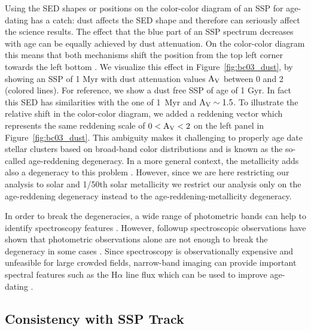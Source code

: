 Using the SED shapes or positions on the color-color diagram of an SSP for age-dating has a catch: dust affects the SED shape and therefore can seriously affect the science results. The effect that the blue part of an SSP spectrum decreases with age can be equally achieved by dust attenuation. On the color-color diagram this means that both mechanisms shift the position from the top left corner towards the left bottom \citep[e.g.][]{whitmore_what_2002,whitmore_what_2002}. 
We visualize this effect in Figure~\ref{fig:bc03_dust}, by showing an SSP of 1 Myr with dust attenuation values ${\rm A_{V}}$ between 0 and 2 (colored lines). For reference, we show a dust free SSP of age of 1 Gyr. In fact this SED has similarities with the one of 1~Myr and ${\rm A_{V}\sim1.5}$. To illustrate the relative shift in the color-color diagram, we added a reddening vector which represents the same reddening scale of ${0 < \rm A_{V} < 2}$ on the left panel in Figure~\ref{fig:bc03_dust}. 
This ambiguity makes it challenging to properly age date stellar clusters based on broad-band color distributions and is known as the so-called age-reddening degeneracy. In a more general context, the metallicity adds also a degeneracy to this problem \citep{worthey_age-metallicity_1999}. However, since we are here restricting our analysis to solar and 1/50th solar metallicity we restrict our analysis only on the age-reddening degeneracy instead to the age-reddening-metallicity degeneracy. 


In order to break the degeneracies, a wide range of photometric bands can help to identify spectroscopy features \citep{anders_analysing_2004,smith_hststis_2006,smith_young_2007}. However, followup spectroscopic observations have shown that photometric observations alone are not enough to break the degeneracy in some cases \citep{chandar_ngc_2004,annibali_lbtmods_2018,whitmore_legus_2020}. Since spectroscopy is observationally expensive and unfeasible for large crowded fields, narrow-band imaging can provide important spectral features such as the H$\alpha$ line flux which can be used to improve age-dating \citep{whitmore_what_2002, anders_spectral_2003,fouesneau_analyzing_2012,ashworth_exploring_2017,barnes_comparing_2021,whitmore_improving_2023}.












\subsection{Consistency with SSP Track}

